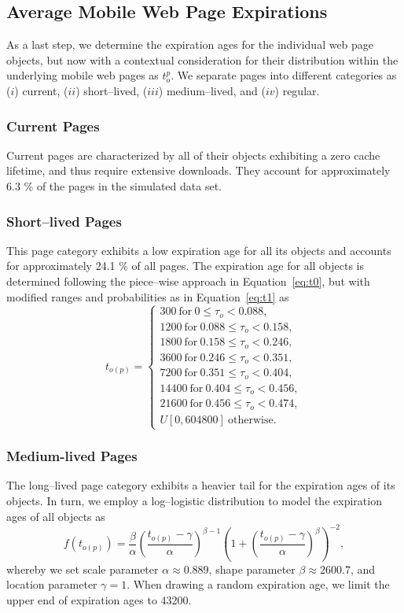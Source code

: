 \documentclass[letterpaper,conference]{IEEEtran}
\begin{document}
\subsection{Average Mobile Web Page Expirations}
As a last step, we determine the expiration ages for the individual web page objects, but now with a contextual consideration for their distribution within the underlying mobile web pages as $t_o^p$.
We separate pages into different categories as ($i$) current, ($ii$) short--lived, ($iii$) medium--lived, and ($iv$) regular.

\subsubsection{Current Pages}
Current pages are characterized by all of their objects exhibiting a zero cache lifetime, and thus require extensive downloads. 
They account for approximately 6.3 \% of the pages in the simulated data set.

\subsubsection{Short--lived Pages}
This page category exhibits a low expiration age for all its objects and accounts for approximately 24.1 \% of all pages.
The expiration age for all objects is determined following the piece--wise approach in Equation~\ref{eq:t0}, but with modified ranges and probabilities as in Equation~\ref{eq:t1} as 
\begin{equation}\label{eq:t1}
t_{o(p)} =
\begin{cases}
300 ~\mathrm{for}~ 0 \le \tau_o < 0.088, \\
1200 ~\mathrm{for}~ 0.088 \le \tau_o < 0.158, \\
1800 ~\mathrm{for}~0.158\le \tau_o < 0.246,\\
3600 ~\mathrm{for}~0.246 \le \tau_o < 0.351,\\
7200 ~\mathrm{for}~0.351 \le \tau_o < 0.404,\\
14400 ~\mathrm{for}~0.404 \le \tau_o < 0.456,\\
21600 ~\mathrm{for}~0.456 \le \tau_o < 0.474,\\
U[0, 604800]~\mathrm{otherwise}.
\end{cases}
\end{equation}

\subsubsection{Medium-lived Pages}
The long--lived page category exhibits a heavier tail for the expiration ages of its objects.
In turn, we employ a log--logistic distribution to model the expiration ages of all objects as 
\begin{equation*}
f(t_{o(p)})=\frac{\beta}{\alpha} \left(\frac{t_{o(p)}-\gamma}{\alpha}\right)^{\beta-1}\left(1+\left(\frac{t_{o(p)}-\gamma}{\alpha}\right)^\beta\right)^{-2},
\end{equation*}
whereby we set scale parameter $\alpha \approx 0.889 $, shape parameter $\beta \approx 2600.7$, and location parameter $\gamma=1$. 
When drawing a random expiration age, we limit the upper end of expiration ages to 43200.
\end{document}
